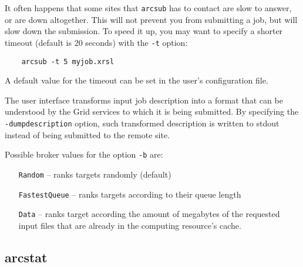 It often happens that some sites that \verb#arcsub# has to contact
are slow to answer, or are down altogether. This will not prevent
you from submitting a job, but will slow down the submission. To
speed it up, you may want to specify a shorter timeout (default is
20 seconds) with the \verb#-t# option:
\begin{verbatim}
    arcsub -t 5 myjob.xrsl
\end{verbatim}

A default value for the timeout can be set in the user's configuration file.

The user interface transforms input job description into a format
that can be understood by the Grid services to which it is being
submitted. By specifying the \verb#-dumpdescription# option, such transformed
description is written to stdout instead of being submitted to the remote site.

Possible broker values for the option \verb#-b# are:
\begin{itemize}
 \item[\texttt{Random}] -- ranks targets randomly (default)
 \item[\texttt{FastestQueue}] -- ranks targets according to their queue length
 \item[\texttt{Data}] -- ranks target according the amount of megabytes of the
requested input files that are already in the computing resource’s cache.
\end{itemize}


\subsection{arcstat}
\label{sec:arcstat}

